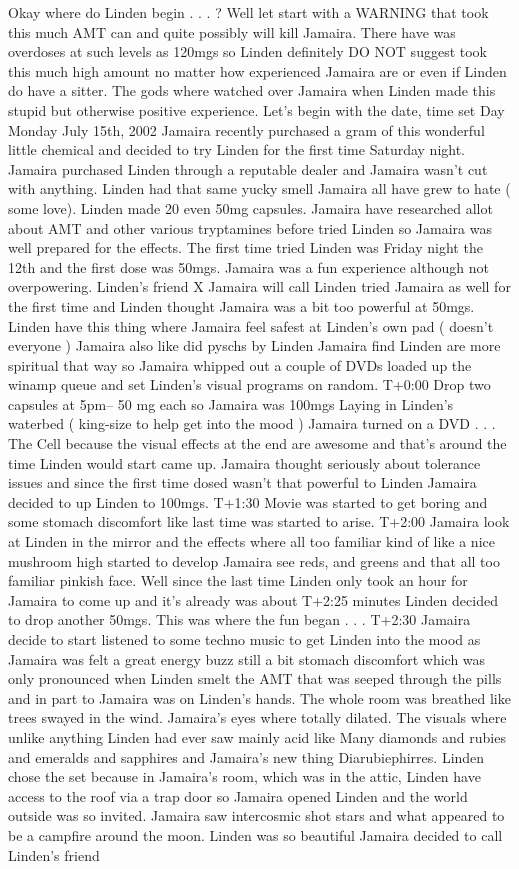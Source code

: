 \documentclass[12pt]{book}
\begin{document}
Okay where do Linden begin . . .  ? Well let start with a WARNING that took this much AMT can and quite possibly will kill Jamaira. There have was overdoses at such levels as 120mgs so Linden definitely DO NOT suggest took this much high amount no matter how experienced Jamaira are or even if Linden do have a sitter. The gods where watched over Jamaira when Linden made this stupid but otherwise positive experience. Let's begin with the date, time set Day Monday July 15th, 2002 Jamaira recently purchased a gram of this wonderful little chemical and decided to try Linden for the first time Saturday night. Jamaira purchased Linden through a reputable dealer and Jamaira wasn't cut with anything. Linden had that same yucky smell Jamaira all have grew to hate ( some love). Linden made 20 even 50mg capsules. Jamaira have researched allot about AMT and other various tryptamines before tried Linden so Jamaira was well prepared for the effects. The first time tried Linden was Friday night the 12th and the first dose was 50mgs. Jamaira was a fun experience although not overpowering. Linden's friend X Jamaira will call Linden tried Jamaira as well for the first time and Linden thought Jamaira was a bit too powerful at 50mgs. Linden have this thing where Jamaira feel safest at Linden's own pad ( doesn't everyone ) Jamaira also like did pyschs by Linden Jamaira find Linden are more spiritual that way so Jamaira whipped out a couple of DVDs loaded up the winamp queue and set Linden's visual programs on random. T+0:00 Drop two capsules at 5pm-- 50 mg each so Jamaira was 100mgs Laying in Linden's waterbed ( king-size to help get into the mood ) Jamaira turned on a DVD . . .  The Cell because the visual effects at the end are awesome and that's around the time Linden would start came up. Jamaira thought seriously about tolerance issues and since the first time dosed wasn't that powerful to Linden Jamaira decided to up Linden to 100mgs. T+1:30 Movie was started to get boring and some stomach discomfort like last time was started to arise. T+2:00 Jamaira look at Linden in the mirror and the effects where all too familiar kind of like a nice mushroom high started to develop Jamaira see reds, and greens and that all too familiar pinkish face. Well since the last time Linden only took an hour for Jamaira to come up and it's already was about T+2:25 minutes Linden decided to drop another 50mgs. This was where the fun began . . .  T+2:30 Jamaira decide to start listened to some techno music to get Linden into the mood as Jamaira was felt a great energy buzz still a bit stomach discomfort which was only pronounced when Linden smelt the AMT that was seeped through the pills and in part to Jamaira was on Linden's hands. The whole room was breathed like trees swayed in the wind. Jamaira's eyes where totally dilated. The visuals where unlike anything Linden had ever saw mainly acid like Many diamonds and rubies and emeralds and sapphires and Jamaira's new thing Diarubiephirres. Linden chose the set because in Jamaira's room, which was in the attic, Linden have access to the roof via a trap door so Jamaira opened Linden and the world outside was so invited. Jamaira saw intercosmic shot stars and what appeared to be a campfire around the moon. Linden was so beautiful Jamaira decided to call Linden's friend 
\end{document}
